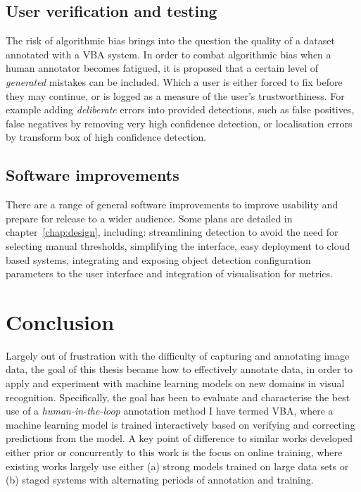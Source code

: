 \subsection{User verification and testing}
\label{sec:user_verification}

The risk of algorithmic bias brings into the question the quality of a dataset annotated with a \gls{VBA} system.  In order to combat algorithmic bias when a human annotator becomes fatigued, it is proposed that a certain level of \emph{generated} mistakes can be included. Which a user is either forced to fix before they may continue, or is logged as a measure of the user's trustworthiness. For example adding \emph{deliberate} errors into provided detections, such as false positives, false negatives by removing very high confidence detection, or localisation errors by transform box of high confidence detection. 


\subsection{Software improvements}

There are a range of general software improvements to improve usability and prepare for release to a wider audience. Some plans are detailed in chapter~\ref{chap:design}, including: streamlining detection to avoid the need for selecting manual thresholds, simplifying the interface, easy deployment to cloud based systems, integrating and exposing object detection configuration parameters to the user interface and integration of visualisation for metrics.

\section{Conclusion}
\label{sec:conclusion}
\glsresetall

Largely out of frustration with the difficulty of capturing and annotating image data, the goal of this thesis became how to effectively annotate data, in order to apply and experiment with machine learning models on new domains in visual recognition. Specifically, the goal has been to evaluate and characterise the best use of a \emph{human-in-the-loop} annotation method I have termed \gls{VBA}, where a machine learning model is trained interactively based on verifying and correcting predictions from the model. A key point of difference to similar works developed either prior or concurrently to this work is the focus on online training, where existing works largely use either (a) strong models trained on large data sets or (b) staged systems with alternating periods of annotation and training. 

